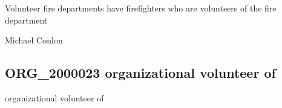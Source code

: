 \documentclass[letterpaper,10pt,english]{sphinxmanual}
\begin{document}
\begin{sphinxShadowBox}

\sphinxAtStartPar
{\hyperref[\detokenize{doc-NCBITaxon_9606::doc}]{}}
\end{sphinxShadowBox}

\begin{sphinxShadowBox}

\sphinxAtStartPar
{\hyperref[\detokenize{doc-ORG_2000023::doc}]{}}
\end{sphinxShadowBox}

\begin{sphinxShadowBox}

\sphinxAtStartPar
Volunteer fire departments have firefighters who are volunteers of the fire department
\end{sphinxShadowBox}

\begin{sphinxShadowBox}

\sphinxAtStartPar
Michael Conlon 
\end{sphinxShadowBox}
\begin{quote}

\ignorespaces \end{quote}


\subsection{ORG\_2000023 \sphinxhyphen{} organizational volunteer of}
\label{\detokenize{doc-ORG_2000023:org-2000023-organizational-volunteer-of}}\label{\detokenize{doc-ORG_2000023:index-0}}\label{\detokenize{doc-ORG_2000023::doc}}
\begin{sphinxShadowBox}

\sphinxAtStartPar
organizational volunteer of
\end{sphinxShadowBox}

\begin{sphinxShadowBox}

\sphinxAtStartPar
{}
\end{sphinxShadowBox}
\end{document}
